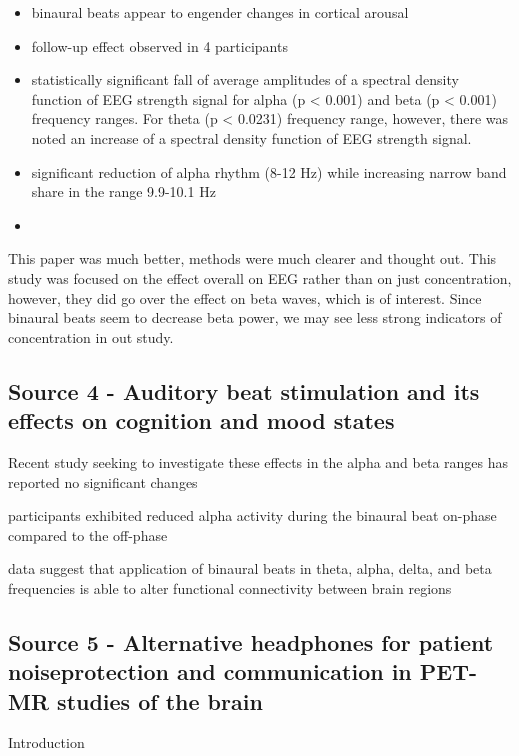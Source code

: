 \documentclass[a4paper]{article}
\begin{document}
\begin{itemize}
          \begin{itemize}
              \item binaural beats appear to engender changes in cortical arousal
              \item follow-up effect observed in 4 participants
              \item statistically significant fall of average amplitudes of a spectral density function of EEG strength signal for alpha (p < 0.001) and beta (p < 0.001) frequency ranges. For theta (p < 0.0231) frequency range, however, there was noted an increase of a spectral density function of EEG strength signal.
              \item signiﬁcant reduction of alpha rhythm (8-12 Hz) while increasing narrow band share in the range 9.9-10.1 Hz
              \item
          \end{itemize}
\end{itemize}

This paper was much better, methods were much clearer and thought out. This study was focused on the effect overall on EEG rather than on just concentration, however, they did go over the effect on beta waves, which is of interest. Since binaural beats seem to decrease beta power, we may see less strong indicators of concentration in out study.

\subsection*{Source 4 - Auditory beat stimulation and its effects on cognition and mood states}

Recent study seeking to investigate these effects in the alpha and beta ranges has reported no significant changes

participants exhibited reduced alpha activity during the binaural beat on-phase compared to the off-phase

data suggest that application of binaural beats in theta, alpha, delta, and beta frequencies is able to alter functional connectivity between brain regions

\subsection*{Source 5 - Alternative headphones for patient noiseprotection and communication in PET-MR studies of the brain}

Introduction
\end{document}
